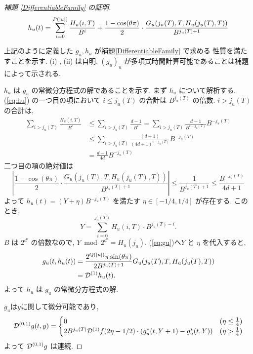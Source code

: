 \begin{proof}[\rm 補題 \ref{DifferentiableFamily} の証明]
 \begin{equation} 
  h_u(t) = \sum^{{P(|u|)}}_{i=0} \frac{H_u(i, T)}{B^i}  
  + \frac{1-\cos(\theta\pi)}{2} 
  \cdot \frac{G_u(j_u(T), T, H_u(j_u(T), T))}{B^{j_u(T)+1}} \label{eq:hu}
 \end{equation}

 上記のように定義した $g_u, h_u$ が補題\ref{DifferentiableFamily} で求める
 性質を満たすことを示す. (i) , (ii) は自明. 
 $(g_u)_u$ が多項式時間計算可能であることは補題によって示される.

 $h_u$ は $g_u$ の常微分方程式の解であることを示す.
 まず $h_u$ について解析する. (\ref{eq:hu}) の一つ目の項において
 $i \le j_u(T)$ の合計は $B^{j_u(T)}$ の倍数. $i > j_u(T)$ の合計は, 
 \begin{align*}
  \sum_{i>j_u(T)} \frac{H_u(i, T)}{B^i} 
  & \le \sum_{i>j_u(T)} \frac{d-1}{B^i} 
   = \sum_{i>j_u(T)} \frac{d-1}{B^{i-j_u(T)}}B^{-j_u(T)} \\
  & \le \sum_{i>j_u(T)} \frac{(d-1)}{(4d+1)^{i-j_u(T)}}B^{-j_u(T)} \\
  & = \frac{d-1}{4d}B^{-j_u(T)}
 \end{align*}
 二つ目の項の絶対値は
 \begin{equation}
  \left| \frac{1-\cos(\theta\pi)}{2} 
   \cdot \frac{G_u(j_u(T), T, H_u(j_u(T), T))}{B^{j_u(T)+1}} \right|
  \le \frac{1}{B^{j_u(T)+1}}
  \le \frac{B^{-j_u(T)}}{4d+1}
 \end{equation}
 よって $h_u(t) = (Y + \eta) B^{-j_u(T)}$ を満たす $\eta \in [-1/4, 1/4]$
 が存在する. このとき,
 \begin{equation}
  Y = \sum_{i=0}^{j_u(T)}H_u(i, T) \cdot B^{j_u(T) - i} .
 \end{equation}
 $B$ は $2^{d'}$ の倍数なので, $Y \bmod 2^{d'} = H_u(j_u)$. 
 (\ref{eq:gu})へ$Y$ と $\eta$ を代入すると,
 \begin{align*}
   g_u(t, h_u(t)) 
  & =  \frac{2^{Q(|u|)} \pi \sin(\theta\pi)}{2B^{j_u(T)+1}}
   G_u(j_u(T), T, H_u(j_u(T), T)) \\
  & =  \mathcal D^{(1)}h_u(t).
 \end{align*}
 よって $h_u$ は $g_u$ の常微分方程式の解.

 $g_u$は$y$に関して微分可能であり,
 \begin{equation}
  \mathcal D^{(0,1)} g(t, y)
  = \begin{cases}
     0 & (\eta \le \frac 1 4) \\
     2B^{j_u(T)}\mathcal D^{(1)}f(2\eta- 1/2)
      \cdot (g^*_u (t, Y+1)-g^*_u(t, Y))
     & (\eta > \frac 1 4)
    \end{cases}
 \end{equation}
 よって $\mathcal D^{(0,1)} g$ は連続.


\end{proof}
